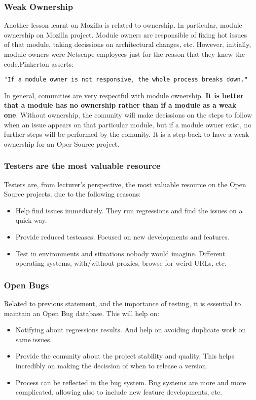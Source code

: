 \documentclass[11pt]{article}
\begin{document}
\subsubsection{Weak Ownership}
Another lesson learnt on Mozilla is related to ownership. In particular, module ownership on Mozilla project. Module owners are responsible of fixing hot issues of that module, taking decissions on architectural changes, etc. However, initially, module owners were Netscape employees just for the reason that they knew the code.Pinkerton asserts:
\begin{verbatim}
"If a module owner is not responsive, the whole process breaks down."
\end{verbatim}
In general, comunities are very respectful with module ownership. \textbf{It is better that a module has no ownership rather than if a module as a weak one}. Without ownership, the comunity will make decissions on the steps to follow when an issue appears on that particular module, but if a module owner exist, no further steps will be performed by the comunity. It is a step back to have a weak ownership for an Oper Source project.

\subsubsection{Testers are the most valuable resource}
Testers are, from lecturer's perspective, the most valuable resource on the Open Source projects, due to the following reasons:
\begin{itemize}\itemsep0pt
\item{Help find issues immediately}. They run regressions and find the issues on a quick way.
\item{Provide reduced testcases}. Focused on new developments and features.
\item{Test in environments and situations nobody would imagine}. Different operating systems, with/without proxies, browse for weird URLs, etc.
\end{itemize}

\subsubsection{Open Bugs}
Related to previous statement, and the importance of testing, it is essential to maintain an Open Bug database. This will help on:
\begin{itemize}\itemsep0pt
\item{Notifying about regressions results}. And help on avoiding duplicate work on same issues.
\item{Provide the comunity about the project stability and quality}. This helps incredibly on making the decission of when to release a version.
\item{Process can be reflected in the bug system}. Bug systems are more and more complicated, allowing also to include new feature developments, etc.
\end{itemize}
\end{document}
